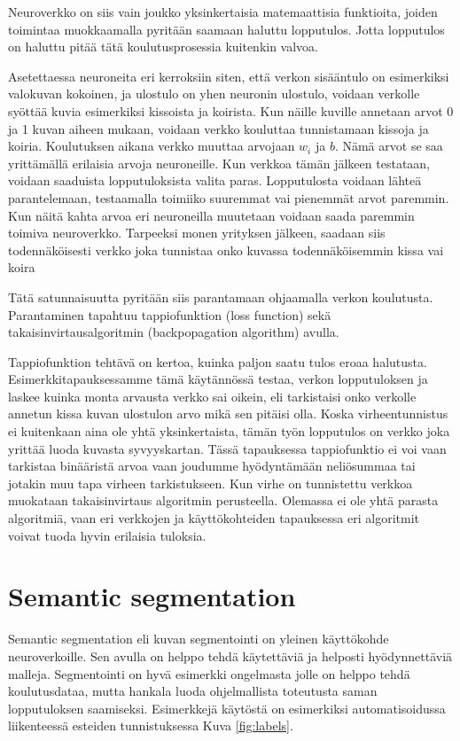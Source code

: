 Neuroverkko on siis vain joukko yksinkertaisia matemaattisia funktioita,
joiden toimintaa muokkaamalla pyritään saamaan haluttu lopputulos.
Jotta lopputulos on haluttu pitää tätä koulutusprosessia kuitenkin valvoa.


Asetettaessa neuroneita eri kerroksiin siten, että verkon sisääntulo on esimerkiksi valokuvan kokoinen, 
ja ulostulo on yhen neuronin ulostulo, 
voidaan verkolle syöttää kuvia esimerkiksi kissoista ja koirista.
Kun näille kuville annetaan arvot 0 ja 1 kuvan aiheen mukaan, voidaan verkko kouluttaa tunnistamaan kissoja ja koiria.
Koulutuksen aikana verkko muuttaa arvojaan \(w_i\) ja \(b\).
Nämä arvot se saa yrittämällä erilaisia arvoja neuroneille.
Kun verkkoa tämän jälkeen testataan, voidaan saaduista lopputuloksista valita paras.
Lopputulosta voidaan lähteä parantelemaan, testaamalla toimiiko suuremmat vai pienemmät arvot paremmin.
Kun näitä kahta arvoa eri neuroneilla muutetaan voidaan saada paremmin toimiva neuroverkko.
Tarpeeksi monen yrityksen jälkeen, saadaan siis todennäköisesti verkko joka tunnistaa onko kuvassa todennäköisemmin kissa vai koira

Tätä satunnaisuutta pyritään siis parantamaan ohjaamalla verkon koulutusta.
Parantaminen tapahtuu tappiofunktion (loss function) sekä takaisinvirtausalgoritmin (backpopagation algorithm) avulla.

Tappiofunktion tehtävä on kertoa, kuinka paljon saatu tulos eroaa halutusta.
Esimerkkitapauksessamme tämä käytännössä testaa, verkon lopputuloksen ja laskee kuinka monta arvausta verkko sai oikein,
eli tarkistaisi onko verkolle annetun kissa kuvan ulostulon arvo mikä sen pitäisi olla.
Koska virheentunnistus ei kuitenkaan aina ole yhtä yksinkertaista, tämän työn lopputulos on verkko joka yrittää luoda kuvasta syvyyskartan.
Tässä tapauksessa tappiofunktio ei voi vaan tarkistaa binääristä arvoa vaan joudumme hyödyntämään neliösummaa tai jotakin muu tapa virheen tarkistukseen.
Kun virhe on tunnistettu verkkoa muokataan takaisinvirtaus algoritmin perusteella.
Olemassa ei ole yhtä parasta algoritmiä, vaan eri verkkojen ja käyttökohteiden tapauksessa eri algoritmit voivat tuoda hyvin erilaisia tuloksia.

\section{Semantic segmentation}

Semantic segmentation eli kuvan segmentointi on yleinen käyttökohde neuroverkoille.
Sen avulla on helppo tehdä käytettäviä ja helposti hyödynnettäviä malleja.
Segmentointi on hyvä esimerkki ongelmasta jolle on helppo tehdä koulutusdataa, mutta hankala luoda ohjelmallista toteutusta saman lopputuloksen saamiseksi.
Esimerkkejä käytöstä on esimerkiksi automatisoidussa liikenteessä esteiden tunnistuksessa Kuva \ref{fig:labels}.

